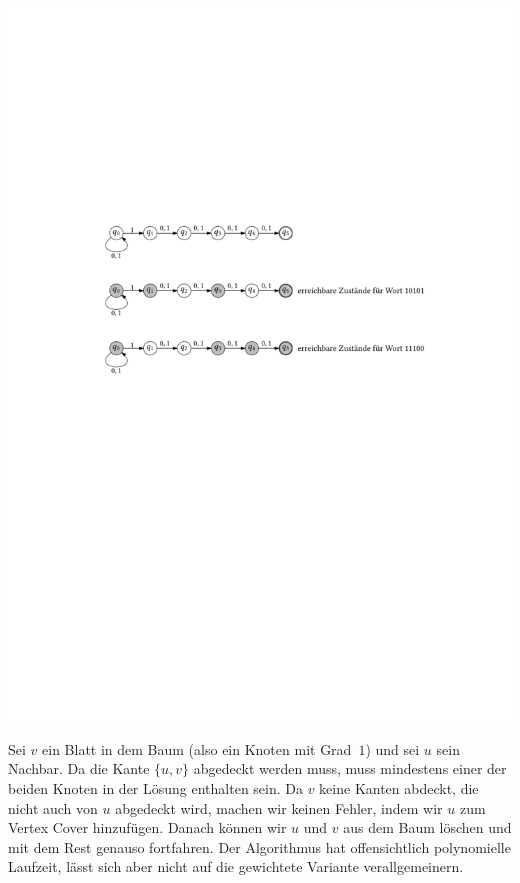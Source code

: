 \begin{center}
  \vspace{1ex}
  \includegraphics[page=1]{fig/01-NEA}
\end{center}


\subexercise
\label{sec:vc-tree}

Sei $v$ ein Blatt in dem Baum (also ein Knoten mit Grad~$1$) und sei
$u$ sein Nachbar.  Da die Kante $\{u, v\}$ abgedeckt werden muss, muss
mindestens einer der beiden Knoten in der Lösung enthalten sein.  Da
$v$ keine Kanten abdeckt, die nicht auch von $u$ abgedeckt wird,
machen wir keinen Fehler, indem wir $u$ zum Vertex Cover hinzufügen.
Danach können wir $u$ und $v$ aus dem Baum löschen und mit dem Rest
genauso fortfahren.  Der Algorithmus hat offensichtlich polynomielle
Laufzeit, lässt sich aber nicht auf die gewichtete Variante
verallgemeinern.

